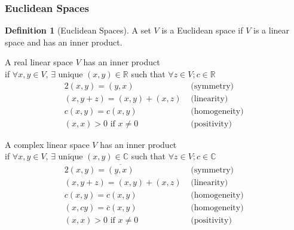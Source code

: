 \documentclass[twoside]{amsart}
\theoremstyle{plain}
\theoremstyle{definition}
\newtheorem{definition}{Definition}
\begin{document}
\subsubsection{Euclidean Spaces}\label{subsubS:Euclidean_Spaces}
\begin{definition}[Euclidean Spaces]\label{D:Euclidean_Spaces}
A set $V$ is a Euclidean space if $V$ is a linear space and has an inner product.  

A real linear space $V$ has an inner product \\
\phantom{A real} if $\forall x,y \in V, \, \exists $ unique $(x,y) \in \mathbb{R}$ such that $\forall z \in V; c \in \mathbb{R}$
\begin{alignat}{2}
(x,y) = (y,x) & \text{ (symmetry) } \\
(x,y+z) = (x,y)+(x,z) & \text{ (linearity) } \\
c(x,y) = c(x,y) & \text{ (homogeneity) } \\
(x,x) > 0 \text{ if } x \neq 0 & \text{ (positivity) } 
\end{alignat}

A complex linear space $V$ has an inner product \\
\phantom{A complex} if $\forall x,y \in V, \, \exists $ unique $(x,y) \in \mathbb{C}$ such that $\forall z \in V; c \in \mathbb{C}$
\begin{alignat}{2}
(x,y) = \overline{(y,x)} & \text{ (symmetry) } \\
(x,y+z) = (x,y)+(x,z) & \text{ (linearity) } \\
c(x,y) = c(x,y) & \text{ (homogeneity) } \\
(x,cy) = \overline{c}(x,y) & \text{ (homogeneity) } \\
(x,x) > 0 \text{ if } x \neq 0 & \text{ (positivity) } 
\end{alignat}
\end{definition}
\end{document}
